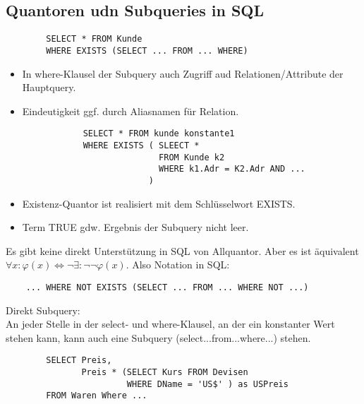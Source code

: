\subsection{Quantoren udn Subqueries in SQL}
\begin{example}[Subquery]
    \begin{verbatim}
        SELECT * FROM Kunde 
        WHERE EXISTS (SELECT ... FROM ... WHERE)
    \end{verbatim}
\end{example}
\begin{remark}
    \begin{itemize}
        \item In where-Klausel der Subquery auch Zugriff aud Relationen/Attribute der Hauptquery.
        \item Eindeutigkeit ggf. durch Aliasnamen f\"ur Relation. \begin{verbatim}
            SELECT * FROM kunde konstante1
            WHERE EXISTS ( SLEECT * 
                           FROM Kunde k2
                           WHERE k1.Adr = K2.Adr AND ...
                         )
        \end{verbatim}
        \item Existenz-Quantor ist realisiert mit dem Schl\"usselwort EXISTS.
        \item Term TRUE gdw. Ergebnis der Subquery nicht leer.
    \end{itemize}
\end{remark}

Es gibt keine direkt Unterst\"utzung in SQL von Allquantor. Aber es ist \"aquivalent \(\forall x:\varphi(x) \Leftrightarrow \neg \exists : \neg \neg \varphi(x)\). Also Notation in SQL:
\begin{verbatim}
    ... WHERE NOT EXISTS (SELECT ... FROM ... WHERE NOT ...)
\end{verbatim}

Direkt Subquery:\\
An jeder Stelle in der select- und where-Klausel, an der 
ein konstanter Wert stehen kann, kann auch eine Subquery 
(select...from...where...) stehen.
\begin{example}
    \begin{verbatim}
        SELECT Preis,
               Preis * (SELECT Kurs FROM Devisen
                        WHERE DName = 'US$' ) as USPreis
        FROM Waren Where ...
    \end{verbatim}
\end{example}

